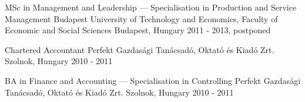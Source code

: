 


\begin{cventries}


  \cventry
    {MSc in Management and Leadership — Specialisation in Production and Service Management} %
    {Budapest University of Technology and Economics, Faculty of Economic and Social Sciences} %
    {Budapest, Hungary} %
    {2011 - 2013, postponed} %
    {
    }


  \cventry
    {Chartered Accountant} %
    {Perfekt Gazdasági Tanácsadó, Oktató és Kiadó Zrt.} %
    {Szolnok, Hungary} %
    {2010 - 2011} %
    {
    }


  \cventry
    {BA in Finance and Accounting — Specialisation in Controlling} %
    {Perfekt Gazdasági Tanácsadó, Oktató és Kiadó Zrt.} %
    {Szolnok, Hungary} %
    {2010 - 2011} %
    {
    }


\end{cventries}
